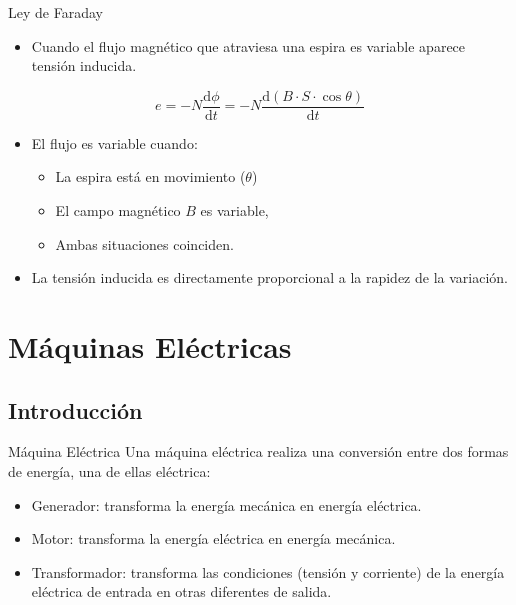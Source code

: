 \documentclass[xcolor={usenames,svgnames,dvipsnames}]{beamer}
\begin{document}
\begin{frame}[label={sec:orgcdcae8f}]{Ley de Faraday}
\begin{itemize}
\item Cuando el \alert{flujo magnético} que atraviesa una espira es \alert{variable}
aparece \alert{tensión inducida}.
\end{itemize}

\[
e=- N \frac{\mathrm{d}\phi}{\mathrm{d}t} = - N \frac{\mathrm{d}(B \cdot S\cdot \cos \theta)}{\mathrm{d}t} 
\]

\begin{itemize}
\item El flujo es variable cuando:

\begin{itemize}
\item La \alert{espira está en movimiento} (\(\theta\))

\item El \alert{campo magnético \(B\) es variable},

\item Ambas situaciones coinciden.
\end{itemize}

\item La tensión inducida es directamente proporcional a la rapidez de la
variación.
\end{itemize}
\end{frame}


\section{Máquinas Eléctricas}
\label{sec:org94157da}
\subsection{Introducción}
\label{sec:org142a93a}

\begin{frame}[label={sec:org8ec0ddc}]{Máquina Eléctrica}
Una máquina eléctrica realiza una conversión entre dos formas de energía, una de ellas eléctrica:

\begin{itemize}
\item \alert{Generador}: transforma la energía mecánica en energía eléctrica.
\item \alert{Motor}: transforma la energía eléctrica en energía mecánica.
\item \alert{Transformador}: transforma las condiciones (tensión y corriente) de la energía eléctrica de entrada en otras diferentes de salida.
\end{itemize}
\end{frame}
\end{document}
